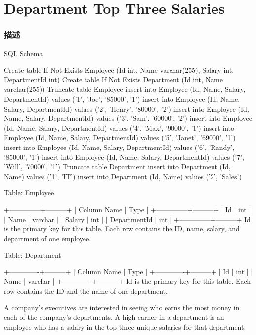 \section{Department Top Three Salaries} %
\label{sec:department-top-three-salaries}


\subsubsection{描述}
SQL Schema

\begin{Code}
Create table If Not Exists Employee (Id int, Name varchar(255), Salary int, DepartmentId int)
Create table If Not Exists Department (Id int, Name varchar(255))
Truncate table Employee
insert into Employee (Id, Name, Salary, DepartmentId) values ('1', 'Joe', '85000', '1')
insert into Employee (Id, Name, Salary, DepartmentId) values ('2', 'Henry', '80000', '2')
insert into Employee (Id, Name, Salary, DepartmentId) values ('3', 'Sam', '60000', '2')
insert into Employee (Id, Name, Salary, DepartmentId) values ('4', 'Max', '90000', '1')
insert into Employee (Id, Name, Salary, DepartmentId) values ('5', 'Janet', '69000', '1')
insert into Employee (Id, Name, Salary, DepartmentId) values ('6', 'Randy', '85000', '1')
insert into Employee (Id, Name, Salary, DepartmentId) values ('7', 'Will', '70000', '1')
Truncate table Department
insert into Department (Id, Name) values ('1', 'IT')
insert into Department (Id, Name) values ('2', 'Sales')
\end{Code}

Table: Employee

\begin{Code}
+--------------+---------+
| Column Name  | Type    |
+--------------+---------+
| Id           | int     |
| Name         | varchar |
| Salary       | int     |
| DepartmentId | int     |
+--------------+---------+
Id is the primary key for this table.
Each row contains the ID, name, salary, and department of one employee.
\end{Code}

Table: Department
\begin{Code}
+-------------+---------+
| Column Name | Type    |
+-------------+---------+
| Id          | int     |
| Name        | varchar |
+-------------+---------+
Id is the primary key for this table.
Each row contains the ID and the name of one department.
\end{Code}

A company's executives are interested in seeing who earns the most money in each of the company's departments. A high earner in a department is an employee who has a salary in the top three unique salaries for that department.

